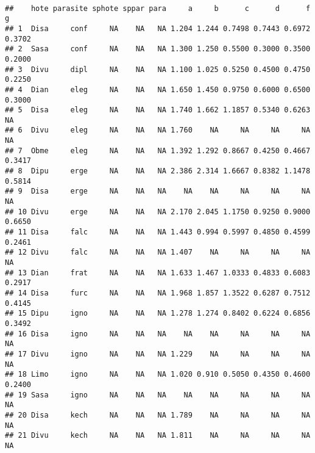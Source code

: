\begin{knitrout}
\color{fgcolor}\begin{kframe}
\begin{flushleft}
\ttfamily\noindent
{}\hlkeyword{(}\hlkeyword{,}{\ }\hlargument{=}{\ }\hlkeyword{(}\hlargument{=}{\ }\hlkeyword{\usebox{\hlnormalsizeboxdollar}}\hlkeyword{,}{\ }\hlargument{=}{\ }\hlkeyword{\usebox{\hlnormalsizeboxdollar}}\hlkeyword{)}\hlkeyword{,}\hspace*{\fill}\\
\hlstd{}{\ }{\ }{\ }{\ }\hlkeyword{)}\mbox{}
\normalfont
\end{flushleft}
\begin{verbatim}
##    hote parasite sphote sppar para     a     b      c      d      f      g
## 1  Disa     conf     NA    NA   NA 1.204 1.244 0.7498 0.7443 0.6972 0.3702
## 2  Sasa     conf     NA    NA   NA 1.300 1.250 0.5500 0.3000 0.3500 0.2000
## 3  Divu     dipl     NA    NA   NA 1.100 1.025 0.5250 0.4500 0.4750 0.2250
## 4  Dian     eleg     NA    NA   NA 1.650 1.450 0.9750 0.6000 0.6500 0.3000
## 5  Disa     eleg     NA    NA   NA 1.740 1.662 1.1857 0.5340 0.6263     NA
## 6  Divu     eleg     NA    NA   NA 1.760    NA     NA     NA     NA     NA
## 7  Obme     eleg     NA    NA   NA 1.392 1.292 0.8667 0.4250 0.4667 0.3417
## 8  Dipu     erge     NA    NA   NA 2.386 2.314 1.6667 0.8382 1.1478 0.5814
## 9  Disa     erge     NA    NA   NA    NA    NA     NA     NA     NA     NA
## 10 Divu     erge     NA    NA   NA 2.170 2.045 1.1750 0.9250 0.9000 0.6650
## 11 Disa     falc     NA    NA   NA 1.443 0.994 0.5997 0.4850 0.4599 0.2461
## 12 Divu     falc     NA    NA   NA 1.407    NA     NA     NA     NA     NA
## 13 Dian     frat     NA    NA   NA 1.633 1.467 1.0333 0.4833 0.6083 0.2917
## 14 Disa     furc     NA    NA   NA 1.968 1.857 1.3522 0.6287 0.7512 0.4145
## 15 Dipu     igno     NA    NA   NA 1.278 1.274 0.8402 0.6224 0.6856 0.3492
## 16 Disa     igno     NA    NA   NA    NA    NA     NA     NA     NA     NA
## 17 Divu     igno     NA    NA   NA 1.229    NA     NA     NA     NA     NA
## 18 Limo     igno     NA    NA   NA 1.020 0.910 0.5050 0.4350 0.4600 0.2400
## 19 Sasa     igno     NA    NA   NA    NA    NA     NA     NA     NA     NA
## 20 Disa     kech     NA    NA   NA 1.789    NA     NA     NA     NA     NA
## 21 Divu     kech     NA    NA   NA 1.811    NA     NA     NA     NA     NA

\end{verbatim}
\end{kframe}
\end{knitrout}
